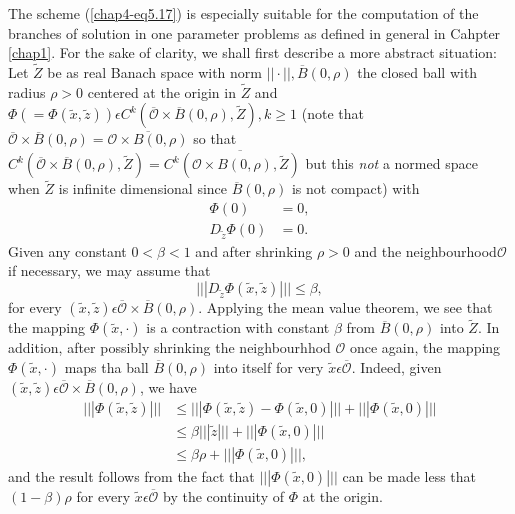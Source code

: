 The scheme (\ref{chap4-eq5.17}) is especially suitable for the
computation of the branches of solution in one parameter problems as
defined in general in Cahpter \ref{chap1}. For the sake of clarity, we
shall first describe a more abstract situation: Let $\widetilde{Z}$ be
as real Banach space with norm $||\cdot||, \overline{B}(0, \rho)$ the
closed ball with radius $\rho > 0$ centered at the origin in
$\widetilde{Z}$ and $\Phi(= \Phi(\widetilde{x}, \widetilde{z}))
\epsilon C^{k}(\overline{\mathscr{O}} \times \overline{B}(0, \rho),
\widetilde{Z}), k \geq 1$ (note that $\overline{\mathscr{O}} \times
\overline{B}(0, \rho) =  \overline{\mathscr{O} \times B(0, \rho)}$ so
that $C^{k}(\overline{\mathscr{O}} \times \overline{B}(0, \rho),
\widetilde{Z}) = C^{k} \overline{(\mathscr{O} \times B(0, \rho),
  \widetilde{Z})}$ but this {\em not} a normed space when
$\widetilde{Z}$ is infinite dimensional since $\overline{B}(0, \rho)$
is not compact) with
\begin{align*}
\Phi(0) & = 0,\\
D_{\widetilde{z}}\Phi(0) & = 0.
\end{align*}
Given any constant $0 < \beta < 1$ and after shrinking $\rho > 0$ and
the neighbourhood\pageoriginale $\mathscr{O}$ if necessary, we may
assume that
$$
|||D_{\widetilde{z}}\Phi(\widetilde{x}, \widetilde{z})||| \leq \beta,
$$
for every $(\widetilde{x}, \widetilde{z}) \epsilon
\overline{\mathscr{O}} \times \overline{B}(0, \rho)$. Applying the
mean value theorem, we see that the mapping $\Phi(\widetilde{x},
\cdot)$ is a contraction with constant $\beta$ from $\overline{B}(0,
\rho)$ into $\widetilde{Z}$. In addition, after possibly shrinking the
neighbourhhod $\mathscr{O}$ once again, the mapping
$\Phi(\widetilde{x}, \cdot)$ maps tha ball $\overline{B}(0, \rho)$
into itself for very $\widetilde{x} \epsilon \overline{\mathscr{O}}$. Indeed,
given $(\widetilde{x}, \widetilde{z}) \epsilon \overline{\mathscr{O}} \times
\overline{B}(0, \rho)$, we have
\begin{align*}
|||\Phi(\widetilde{x}, \widetilde{z})||| & \leq |||\Phi(\widetilde{x},
\widetilde{z}) - \Phi(\widetilde{x}, 0)||| + |||\Phi(\widetilde{x},
0)|||\\
& \leq \beta|||\widetilde{z}||| + |||\Phi(\widetilde{x}, 0)|||\\
& \leq \beta \rho + |||\Phi(\widetilde{x}, 0)|||,
\end{align*}
and the result follows from the fact that $|||\Phi(\widetilde{x},
0)|||$ can be made less that $(1 - \beta)\rho$ for every
$\widetilde{x} \epsilon \overline{\mathscr{O}}$ by the continuity of $\Phi$ at
the origin.

